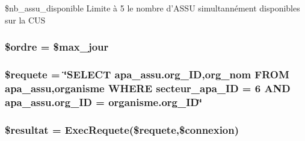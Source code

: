 \$nb\_\-assu\_\-disponible Limite \`{a} 5 le nombre d'ASSU simultann\'{e}ment disponibles sur la CUS \hypertarget{garde__assu__cus_8php_a7}{
\subsubsection[\$ordre]{\setlength{\rightskip}{0pt plus 5cm}\$ordre = \$max\_\-jour}}
\label{garde__assu__cus_8php_a7}


\hypertarget{garde__assu__cus_8php_a2}{
\subsubsection[\$requete]{\setlength{\rightskip}{0pt plus 5cm}\$requete = \char`\"{}SELECT apa\_\-assu.org\_\-ID,org\_\-nom FROM apa\_\-assu,organisme WHERE secteur\_\-apa\_\-ID = 6 AND apa\_\-assu.org\_\-ID = organisme.org\_\-ID\char`\"{}}}
\label{garde__assu__cus_8php_a2}


\hypertarget{garde__assu__cus_8php_a3}{
\subsubsection[\$resultat]{\setlength{\rightskip}{0pt plus 5cm}\$resultat = Exec\-Requete(\$requete,\$connexion)}}
\label{garde__assu__cus_8php_a3}


